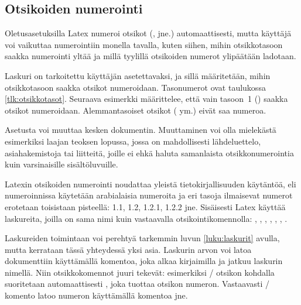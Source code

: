 \subsection{Otsikoiden numerointi}
\label{luku:otsikot_numerointi}

Oletusasetuksilla Latex numeroi otsikot (,
 jne.) automaattisesti, mutta käyttäjä voi vaikuttaa
numerointiin monella tavalla, kuten siihen, mihin otsikkotasoon saakka
numerointi yltää ja millä tyylillä otsikoiden numerot ylipäätään
ladotaan.

Laskuri  on tarkoitettu käyttäjän asetettavaksi,
ja sillä määritetään, mihin otsikkotasoon saakka otsikot numeroidaan.
Tasonumerot ovat taulukossa \ref{tlk:otsikkotasot}. Seuraava esimerkki
määrittelee, että vain tasoon~1 () saakka otsikot
numeroidaan. Alemmantasoiset otsikot ( ym.) eivät
saa numeroa.

\begin{koodilohkosis}
  \setcounter{secnumdepth}{1}
\end{koodilohkosis}

Asetusta voi muuttaa kesken dokumentin. Muuttaminen voi olla mielekästä
esimerkiksi laajan teoksen lopussa, jossa on mahdollisesti
lähdeluettelo, asiahakemistoja tai liitteitä, joille ei ehkä haluta
samanlaista otsikkonumerointia kuin varsinaisille sisältöluvuille.

Latexin otsikoiden numerointi noudattaa yleistä tietokirjallisuuden
käytäntöä, eli numeroinnissa käytetään arabialaisia numeroita ja eri
tasoja ilmaisevat numerot erotetaan toisistaan pisteellä: 1.1, 1.2,
1.2.1, 1.2.2 jne. Sisäisesti Latex käyttää laskureita, joilla on sama
nimi kuin vastaavalla otsikointikomennolla: ,
, , ,
, , .

Laskureiden toimintaan voi perehtyä tarkemmin luvun \ref{luku:laskurit}
avulla, mutta kerrataan tässä yhteydessä yksi asia. Laskurin arvon voi
latoa dokumenttiin käyttämällä komentoa, joka alkaa kirjaimilla
 ja jatkuu laskurin nimellä. Niin otsikkokomennot juuri
tekevät: esimerkiksi \-/ otsikon kohdalla suoritetaan
automaattisesti , joka tuottaa otsikon numeron.
Vastaavasti \-/ komento latoo numeron käyttämällä
komentoa  jne.

